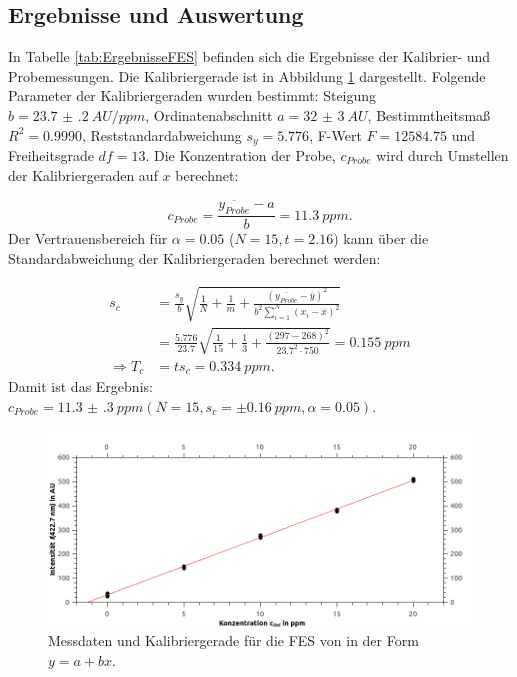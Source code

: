 \subsection{Ergebnisse und Auswertung} \label{sec:ErgebnisseFES}
  
  In Tabelle \ref{tab:ErgebnisseFES} befinden sich die Ergebnisse der Kalibrier- und Probemessungen. Die Kalibriergerade ist in Abbildung \ref{fig:KalibriergeradeEisen} dargestellt. Folgende Parameter der Kalibriergeraden wurden bestimmt: Steigung $b = \SI[mode=text,separate-uncertainty]{23.7(2)}{AU\per ppm}$, Ordinatenabschnitt $a = \SI[mode=text,separate-uncertainty]{32(3)}{AU}$, Bestimmtheitsmaß $R^2 = 0.9990$, Reststandardabweichung $s_y = 5.776$, F-Wert $F = 12584.75$ und Freiheitsgrade $df = 13$. Die Konzentration der Probe, $c_{Probe}$ wird durch Umstellen der Kalibriergeraden auf $x$ berechnet:
  
    \begin{equation}
      c_{Probe} = \frac{\overline{y_{Probe}} - a}{b} = \SI[mode=text]{11.3}{ppm}.
    \end{equation}
  Der Vertrauensbereich für $\alpha = 0.05$ ($N = 15, t = 2.16$) kann über die Standardabweichung der Kalibriergeraden berechnet werden:
  
    \begin{equation}
      \begin{split}
        s_c &= \frac{s_y}{b} \sqrt{\frac{1}{N} + \frac{1}{m} + \frac{\left(\overline{y_{Probe}} - \overline{y}\right)^2}{b^2 \sum_{i=1}^N \left(x_i - \overline{x}\right)^2}} \\
            &= \frac{5.776}{23.7} \sqrt{\frac{1}{15} + \frac{1}{3} + \frac{\left(297 - 268\right)^2}{23.7^2 \cdot 750}} = \SI[mode=text]{0.155}{ppm} \\
     \Rightarrow T_c &= t s_c = \SI[mode=text]{0.334}{ppm}.
      \end{split}
    \end{equation}
  Damit ist das Ergebnis: $c_{Probe} = \SI[mode=text, multi-part-units = brackets, separate-uncertainty]{11.3(3)}{ppm} \left(N = 15, s_c = \pm \SI[mode=text]{0.16}{ppm}, \alpha = 0.05\right)$.
  
  \begin{figure}[H]
    \includegraphics[scale=0.5, center]{images/KalibriergeradeFESCa.png} 
    \caption[Messdaten und Kalibriergerade für die FES von , Quelle: Autor]{Messdaten und Kalibriergerade für die FES von  in der Form $y = a + bx$.}
    \label{fig:KalibriergeradeEisen}
  \end{figure}
  
